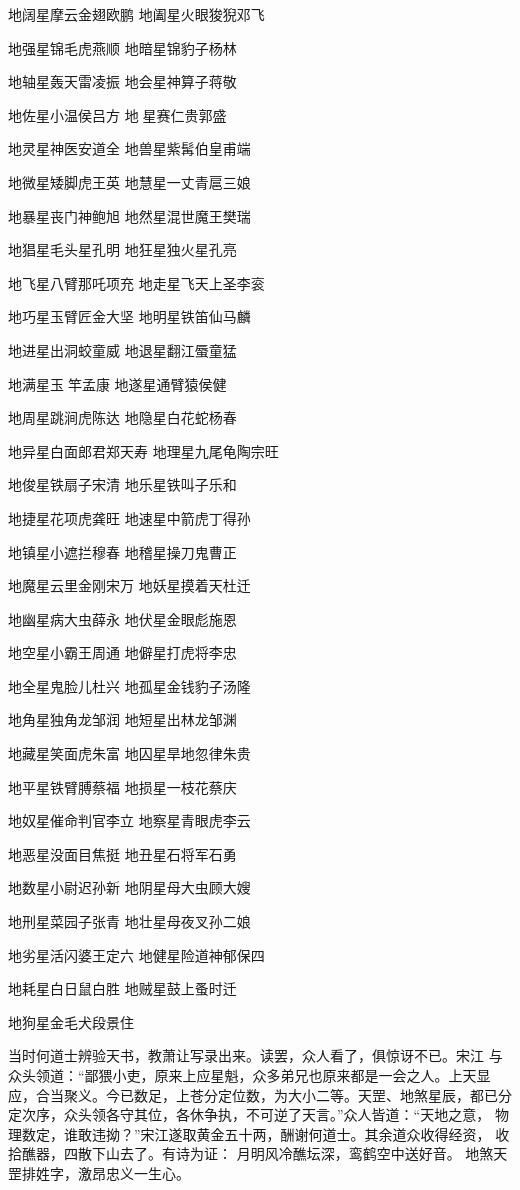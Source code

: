 地阔星摩云金翅欧鹏
地阖星火眼狻猊邓飞

地强星锦毛虎燕顺
地暗星锦豹子杨林

地轴星轰天雷凌振
地会星神算子蒋敬

地佐星小温侯吕方
地星赛仁贵郭盛

地灵星神医安道全
地兽星紫髯伯皇甫端

地微星矮脚虎王英
地慧星一丈青扈三娘

地暴星丧门神鲍旭
地然星混世魔王樊瑞

地猖星毛头星孔明
地狂星独火星孔亮

地飞星八臂那吒项充
地走星飞天上圣李衮

地巧星玉臂匠金大坚
地明星铁笛仙马麟

地进星出洞蛟童威
地退星翻江蜃童猛

地满星玉竿孟康
地遂星通臂猿侯健

地周星跳涧虎陈达
地隐星白花蛇杨春

地异星白面郎君郑天寿
地理星九尾龟陶宗旺

地俊星铁扇子宋清
地乐星铁叫子乐和

地捷星花项虎龚旺
地速星中箭虎丁得孙

地镇星小遮拦穆春
地稽星操刀鬼曹正

地魔星云里金刚宋万
地妖星摸着天杜迁

地幽星病大虫薛永
地伏星金眼彪施恩

地空星小霸王周通
地僻星打虎将李忠

地全星鬼脸儿杜兴
地孤星金钱豹子汤隆

地角星独角龙邹润
地短星出林龙邹渊

地藏星笑面虎朱富
地囚星旱地忽律朱贵

地平星铁臂膊蔡福
地损星一枝花蔡庆

地奴星催命判官李立
地察星青眼虎李云

地恶星没面目焦挺
地丑星石将军石勇

地数星小尉迟孙新
地阴星母大虫顾大嫂

地刑星菜园子张青
地壮星母夜叉孙二娘

地劣星活闪婆王定六
地健星险道神郁保四

地耗星白日鼠白胜
地贼星鼓上蚤时迁

地狗星金毛犬段景住

当时何道士辨验天书，教萧让写录出来。读罢，众人看了，俱惊讶不已。宋江
与众头领道：“鄙猥小吏，原来上应星魁，众多弟兄也原来都是一会之人。上天显
应，合当聚义。今已数足，上苍分定位数，为大小二等。天罡、地煞星辰，都已分
定次序，众头领各守其位，各休争执，不可逆了天言。”众人皆道：“天地之意，
物理数定，谁敢违拗？”宋江遂取黄金五十两，酬谢何道士。其余道众收得经资，
收拾醮器，四散下山去了。有诗为证：
月明风冷醮坛深，鸾鹤空中送好音。
地煞天罡排姓字，激昂忠义一生心。


